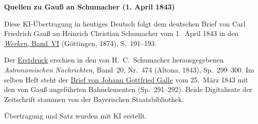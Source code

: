 \clearpage\thispagestyle{empty}
\begin{center}\textbf{Quellen zu Gauß an Schumacher (1. April 1843)}\end{center}
\noindent Diese KI-Übertragung in heutiges Deutsch folgt dem deutschen Brief von Carl Friedrich Gauß an Heinrich Christian Schumacher vom 1.~April 1843 in den \href{https://gdz.sub.uni-goettingen.de/id/PPN236007467}{\textit{Werken}, Band~VI} (Göttingen, 1874), S.~191--193.
\par\smallskip\noindent Der \href{https://api.digitale-sammlungen.de/iiif/image/v2/bsb10049445_00162/full/1600,/0/default.jpg}{Erstdruck} erschien in den von H.~C.~Schumacher herausgegebenen \textit{Astronomischen Nachrichten}, Band~20, Nr.~474 (Altona, 1843), Sp.~299--300. Im selben Heft steht der \href{https://api.digitale-sammlungen.de/iiif/image/v2/bsb10049445_00158/full/1450,/0/default.jpg}{Brief von Johann Gottfried Galle} vom 25.~März 1843 mit den von Gauß angeführten Bahnelementen (Sp.~291--292). Beide Digitalisate der Zeitschrift stammen von der Bayerischen Staatsbibliothek.
\par\smallskip\noindent Übertragung und Satz wurden mit KI erstellt.
\clearpage
